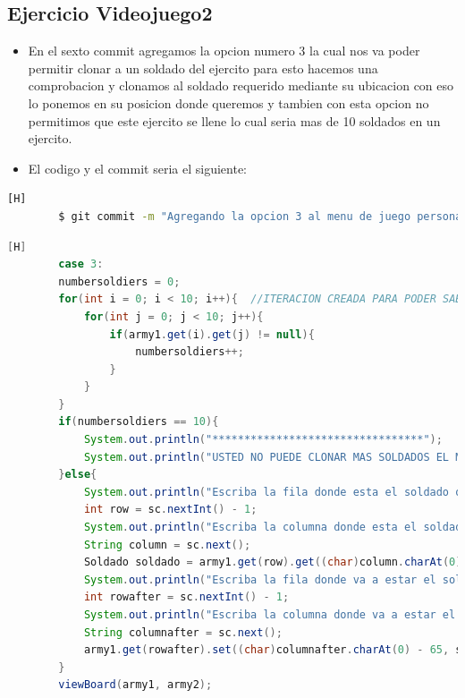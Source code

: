\documentclass{article}
\begin{document}
	\subsection{Ejercicio Videojuego2}
	\begin{itemize}	
		\item En el sexto commit agregamos la opcion numero 3 la cual nos va poder permitir clonar a un soldado del ejercito para esto hacemos una comprobacion y clonamos al soldado requerido mediante su ubicacion con eso lo ponemos en su posicion donde queremos y tambien con esta opcion no permitimos que este ejercito se llene lo cual seria mas de 10 soldados en un ejercito.
		\item El codigo y el commit seria el siguiente:
	\end{itemize}	
	\begin{lstlisting}[language=bash,caption={Commit}][H]
		$ git commit -m "Agregando la opcion 3 al menu de juego personalizado el cual vamos a tener que comprobar que no sobrepase el numero de soldados que es 10 para poder clonar y ver en el tablero para esto hacemos condiciones y buscamos posiciones de los soldados"
	\end{lstlisting}	
	\begin{lstlisting}[language=java,caption={Las lineas de codigos del metodo creado:}][H]
		case 3:
		numbersoldiers = 0;
		for(int i = 0; i < 10; i++){  //ITERACION CREADA PARA PODER SABER QUE SI ESTE BANDO DEL EJERCITO TIENE SOLDADOS PARA PODER JUGAR SI TIENE 10 ESTA OPCION ESTA CANCELADA
			for(int j = 0; j < 10; j++){
				if(army1.get(i).get(j) != null){
					numbersoldiers++;
				}
			}
		}
		if(numbersoldiers == 10){
			System.out.println("*********************************");
			System.out.println("USTED NO PUEDE CLONAR MAS SOLDADOS EL MAXIMO ES 10 SOLDADOS POR EJERCITO");
		}else{
			System.out.println("Escriba la fila donde esta el soldado que quiere clonar:");
			int row = sc.nextInt() - 1;
			System.out.println("Escriba la columna donde esta el soldado que quiere clonar:");
			String column = sc.next();
			Soldado soldado = army1.get(row).get((char)column.charAt(0) - 65);
			System.out.println("Escriba la fila donde va a estar el soldado que quiere clonar:");
			int rowafter = sc.nextInt() - 1;
			System.out.println("Escriba la columna donde va a estar el soldado que quiere clonar:");
			String columnafter = sc.next();
			army1.get(rowafter).set((char)columnafter.charAt(0) - 65, soldado);
		}
		viewBoard(army1, army2);
	\end{lstlisting}
\end{document}
